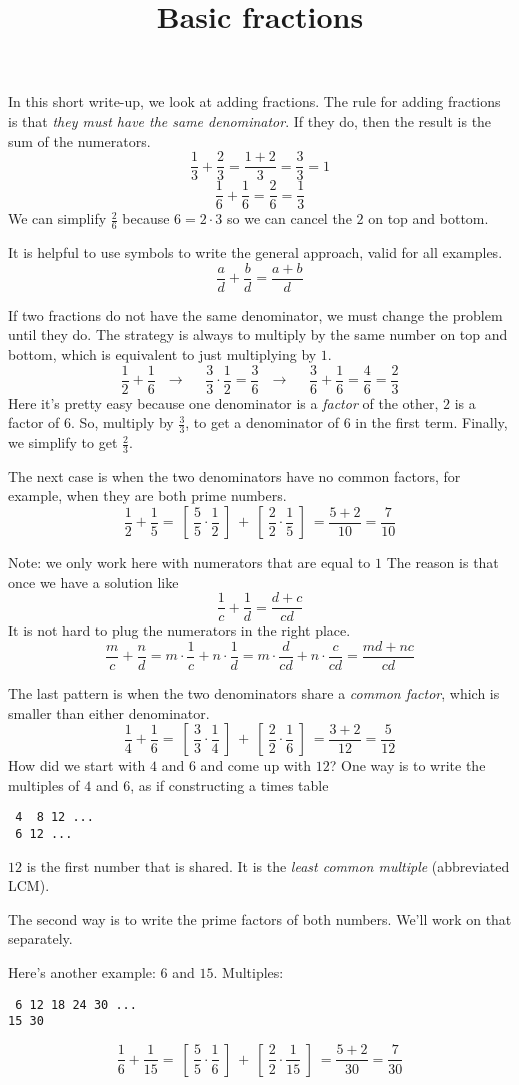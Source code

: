 \documentclass[11pt, oneside]{article}
\title{Basic fractions}
\date{}
\begin{document}
\maketitle
\Large
In this short write-up, we look at adding fractions.  The rule for adding fractions is that \emph{they must have the same denominator}.  If they do, then the result is the sum of the numerators.
\[ \frac{1}{3} + \frac{2}{3} = \frac{1 + 2}{3} = \frac{3}{3} = 1 \]
\[ \frac{1}{6} + \frac{1}{6} = \frac{2}{6} = \frac{1}{3} \]
We can simplify $\frac{2}{6}$ because $6 = 2 \cdot 3$ so we can cancel the $2$ on top and bottom.

It is helpful to use symbols to write the general approach, valid for all examples.
\[ \frac{a}{d} + \frac{b}{d} = \frac{a + b}{d} \]

If two fractions do not have the same denominator, we must change the problem until they do.  The strategy is always to multiply by the same number on top and bottom, which is equivalent to just multiplying by $1$.
\[ \frac{1}{2} + \frac{1}{6} \ \ \   \rightarrow \ \ \ \ \ \  \frac{3}{3} \cdot \frac{1}{2} = \frac{3}{6} \ \ \    \rightarrow  \ \ \ \ \ \    \frac{3}{6} + \frac{1}{6} =  \frac{4}{6} = \frac{2}{3} \]
Here it's pretty easy because one denominator is a \emph{factor} of the other, $2$ is a factor of $6$.    So, multiply by $\frac{3}{3}$, to get a denominator of $6$ in the first term.  Finally, we simplify to get $\frac{2}{3}$.

The next case is when the two denominators have no common factors, for example, when they are both prime numbers.
\[ \frac{1}{2} + \frac{1}{5} = \ [ \  \frac{5}{5} \cdot \frac{1}{2} \ ] \ + \ [ \ \frac{2}{2} \cdot \frac{1}{5} \ ] \ = \frac{5 + 2}{10} = \frac{7}{10}  \]

Note:  we only work here with numerators that are equal to $1$  The reason is that once we have a solution like
\[ \frac{1}{c} + \frac{1}{d} = \frac{d + c}{cd} \]
It is not hard to plug the numerators in the right place.
\[ \frac{m}{c} + \frac{n}{d} = m \cdot \frac{1}{c} + n \cdot \frac{1}{d} = m \cdot \frac{d}{cd} + n \cdot \frac{c}{cd} = \frac{md + nc}{cd} \]

The last pattern is when the two denominators share a \emph{common factor}, which is smaller than either denominator.
\[ \frac{1}{4} + \frac{1}{6} = \ [ \  \frac{3}{3} \cdot \frac{1}{4} \ ] \ + \ [ \ \frac{2}{2} \cdot \frac{1}{6} \ ] \ = \frac{3 + 2}{12} = \frac{5}{12}  \]
How did we start with $4$ and $6$ and come up with $12$?  One way is to write the multiples of $4$ and $6$, as if constructing a times table
\begin{verbatim}
 4  8 12 ...
 6 12 ...
\end{verbatim}
$12$ is the first number that is shared.  It is the \emph{least common multiple} (abbreviated LCM).

The second way is to write the prime factors of both numbers.  We'll work on that separately.

Here's another example:  $6$ and $15$.  Multiples:
\begin{verbatim}
 6 12 18 24 30 ...
15 30
\end{verbatim}
\[ \frac{1}{6} + \frac{1}{15} = \ [ \  \frac{5}{5} \cdot \frac{1}{6} \ ] \ + \ [ \ \frac{2}{2} \cdot \frac{1}{15} \ ] \ = \frac{5 + 2}{30} = \frac{7}{30}  \]
\end{document}
